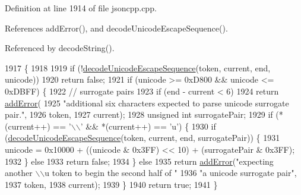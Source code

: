 Definition at line 1914 of file jsoncpp.\+cpp.



References add\+Error(), and decode\+Unicode\+Escape\+Sequence().



Referenced by decode\+String().


\begin{DoxyCode}
1917                                                            \{
1918 
1919   \textcolor{keywordflow}{if} (!\hyperlink{class_json_1_1_our_reader_adb39be814cc6076b91a0919bdd5b24b0}{decodeUnicodeEscapeSequence}(token, current, end, unicode))
1920     \textcolor{keywordflow}{return} \textcolor{keyword}{false};
1921   \textcolor{keywordflow}{if} (unicode >= 0xD800 && unicode <= 0xDBFF) \{
1922     \textcolor{comment}{// surrogate pairs}
1923     \textcolor{keywordflow}{if} (end - current < 6)
1924       \textcolor{keywordflow}{return} \hyperlink{class_json_1_1_our_reader_aa6a920311e6408ff3a45324d49da18a6}{addError}(
1925           \textcolor{stringliteral}{"additional six characters expected to parse unicode surrogate pair."},
1926           token,
1927           current);
1928     \textcolor{keywordtype}{unsigned} \textcolor{keywordtype}{int} surrogatePair;
1929     \textcolor{keywordflow}{if} (*(current++) == \textcolor{charliteral}{'\(\backslash\)\(\backslash\)'} && *(current++) == \textcolor{charliteral}{'u'}) \{
1930       \textcolor{keywordflow}{if} (\hyperlink{class_json_1_1_our_reader_adb39be814cc6076b91a0919bdd5b24b0}{decodeUnicodeEscapeSequence}(token, current, end, surrogatePair)) \{
1931         unicode = 0x10000 + ((unicode & 0x3FF) << 10) + (surrogatePair & 0x3FF);
1932       \} \textcolor{keywordflow}{else}
1933         \textcolor{keywordflow}{return} \textcolor{keyword}{false};
1934     \} \textcolor{keywordflow}{else}
1935       \textcolor{keywordflow}{return} \hyperlink{class_json_1_1_our_reader_aa6a920311e6408ff3a45324d49da18a6}{addError}(\textcolor{stringliteral}{"expecting another \(\backslash\)\(\backslash\)u token to begin the second half of "}
1936                       \textcolor{stringliteral}{"a unicode surrogate pair"},
1937                       token,
1938                       current);
1939   \}
1940   \textcolor{keywordflow}{return} \textcolor{keyword}{true};
1941 \}
\end{DoxyCode}
\mbox{\label{class_json_1_1_our_reader_adb39be814cc6076b91a0919bdd5b24b0}} 
